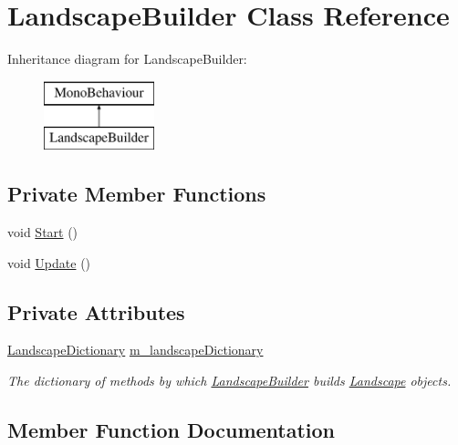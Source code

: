 \hypertarget{class_landscape_builder}{}\section{Landscape\+Builder Class Reference}
\label{class_landscape_builder}
Inheritance diagram for Landscape\+Builder\+:\begin{figure}[H]
\begin{center}
\leavevmode
\includegraphics[height=2.000000cm]{class_landscape_builder}
\end{center}
\end{figure}
\subsection*{Private Member Functions}
\begin{DoxyCompactItemize}
\item 
void \hyperlink{class_landscape_builder_af6eb2a1ca1357aba9dbbf3ea13ef7a09}{Start} ()
\item 
void \hyperlink{class_landscape_builder_a117e41633ea31c2c25abce388a46465d}{Update} ()
\end{DoxyCompactItemize}
\subsection*{Private Attributes}
\begin{DoxyCompactItemize}
\item 
\hyperlink{class_landscape_dictionary}{Landscape\+Dictionary} \hyperlink{class_landscape_builder_ab732ac4dd39fe671a30e3a614a1c65b9}{m\+\_\+landscape\+Dictionary}
\begin{DoxyCompactList}\small\item\em The dictionary of methods by which \hyperlink{class_landscape_builder}{Landscape\+Builder} builds \hyperlink{class_landscape}{Landscape} objects. \end{DoxyCompactList}\end{DoxyCompactItemize}


\subsection{Member Function Documentation}
\mbox{\label{class_landscape_builder_af6eb2a1ca1357aba9dbbf3ea13ef7a09}} 
